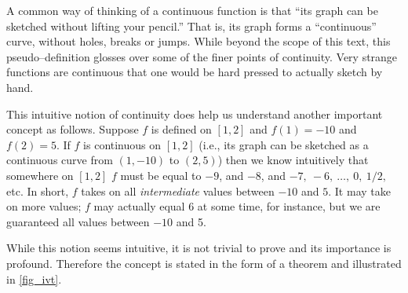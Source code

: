 A common way of thinking of a continuous function is that ``its graph can be sketched without lifting your pencil.'' That is, its graph forms a ``continuous'' curve, without holes, breaks or jumps. While beyond the scope of this text, this pseudo--definition glosses over some of the finer points of continuity. Very strange functions are continuous that one would be hard pressed to actually sketch by hand. 

This intuitive notion of continuity does help us understand another important concept as follows. Suppose $f$ is defined on $[1,2]$ and $f(1) = -10$ and $f(2) = 5$. If $f$ is continuous on $[1,2]$ (i.e., its graph can be sketched as a continuous curve from $(1,-10)$ to $(2,5)$) then we know intuitively that somewhere on $[1,2]$ $f$ must be equal to $-9$, and $-8$, and $-7,\ -6,\ \dotsc,\ 0,\ 1/2,$ etc. In short, $f$ takes on all \textit{intermediate} values between $-10$ and $5$. It may take on more values; $f$ may actually equal 6 at some time, for instance, but we are guaranteed all values between $-10$ and 5. 

While this notion seems intuitive, it is not trivial to prove and its importance is profound. Therefore the concept is stated in the form of a theorem and illustrated in \autoref{fig_ivt}.


